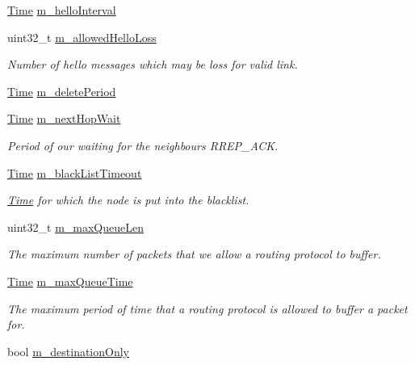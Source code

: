 \begin{DoxyCompactItemize}
\hyperlink{classns3_1_1Time}{Time} \hyperlink{classns3_1_1aodv_1_1RoutingProtocol_aa9750612eb154b537b1d7d0350cb8912}{m\+\_\+hello\+Interval}
\item 
uint32\+\_\+t \hyperlink{classns3_1_1aodv_1_1RoutingProtocol_a80e1dc9b9a640570ba5d5270846a2f6f}{m\+\_\+allowed\+Hello\+Loss}
\begin{DoxyCompactList}\small\item\em Number of hello messages which may be loss for valid link. \end{DoxyCompactList}\item 
\hyperlink{classns3_1_1Time}{Time} \hyperlink{classns3_1_1aodv_1_1RoutingProtocol_aa337fb24748eda19dda872f172e594a3}{m\+\_\+delete\+Period}
\item 
\hyperlink{classns3_1_1Time}{Time} \hyperlink{classns3_1_1aodv_1_1RoutingProtocol_aeac3f146e52514d060a69f1a2d62690b}{m\+\_\+next\+Hop\+Wait}
\begin{DoxyCompactList}\small\item\em Period of our waiting for the neighbour\textquotesingle{}s R\+R\+E\+P\+\_\+\+A\+CK. \end{DoxyCompactList}\item 
\hyperlink{classns3_1_1Time}{Time} \hyperlink{classns3_1_1aodv_1_1RoutingProtocol_a23de7759e9c26ded382a09a860b4f987}{m\+\_\+black\+List\+Timeout}
\begin{DoxyCompactList}\small\item\em \hyperlink{classns3_1_1Time}{Time} for which the node is put into the blacklist. \end{DoxyCompactList}\item 
uint32\+\_\+t \hyperlink{classns3_1_1aodv_1_1RoutingProtocol_a5ded249d42f2e6364728892f32c15d9b}{m\+\_\+max\+Queue\+Len}
\begin{DoxyCompactList}\small\item\em The maximum number of packets that we allow a routing protocol to buffer. \end{DoxyCompactList}\item 
\hyperlink{classns3_1_1Time}{Time} \hyperlink{classns3_1_1aodv_1_1RoutingProtocol_a33caddd54ebe2e9c177b8986b5abb7ba}{m\+\_\+max\+Queue\+Time}
\begin{DoxyCompactList}\small\item\em The maximum period of time that a routing protocol is allowed to buffer a packet for. \end{DoxyCompactList}\item 
bool \hyperlink{classns3_1_1aodv_1_1RoutingProtocol_aad49f5618b2843a1ae43a9c50aabc54f}{m\+\_\+destination\+Only}

\end{DoxyCompactItemize}
